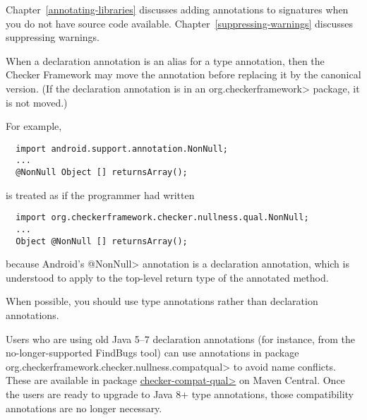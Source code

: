 Chapter~\ref{annotating-libraries} discusses adding annotations to
signatures when you do not have source code available.
Chapter~\ref{suppressing-warnings} discusses suppressing warnings.


When a declaration annotation is an alias for a type annotation, then the
Checker Framework may move the annotation before replacing it by the
canonical version. (If the declaration annotation is in an \<org.checkerframework>
package, it is not moved.)

For example,

\begin{Verbatim}
  import android.support.annotation.NonNull;
  ...
  @NonNull Object [] returnsArray();
\end{Verbatim}

\noindent
is treated as if the programmer had written

\begin{Verbatim}
  import org.checkerframework.checker.nullness.qual.NonNull;
  ...
  Object @NonNull [] returnsArray();
\end{Verbatim}

\noindent
because Android's \<@NonNull> annotation is a declaration annotation, which
is understood to apply to the top-level return type of the annotated method.

When possible, you should use type annotations rather than declaration
annotations.

Users who are using old Java 5--7 declaration annotations (for instance,
from the no-longer-supported FindBugs tool) can use annotations in
package \<org.checkerframework.checker.nullness.compatqual> to avoid name
conflicts.  These are available in package
\href{https://search.maven.org/search?q=a:checker-compat-qual}{\<checker-compat-qual>}
on Maven Central.  Once the users are ready to upgrade to Java 8+ type
annotations, those compatibility annotations are no longer necessary.


